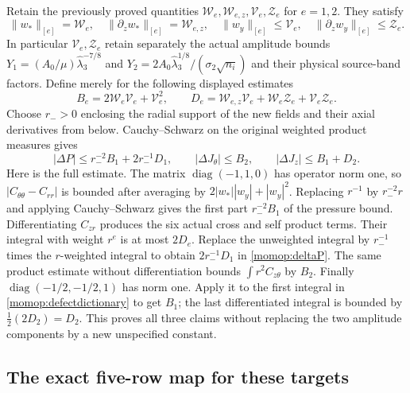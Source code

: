 \documentclass[11pt]{article}
\begin{document}
Retain the previously proved quantities
$\mathcal W_e,\mathcal W_{e,z},\mathcal V_e,\mathcal Z_e$ for
$e=1,2$. They satisfy
\[
 \|w_*\|_{[e]}=\mathcal W_e,\quad
 \|\partial_zw_*\|_{[e]}=\mathcal W_{e,z},\quad
 \|w_y\|_{[e]}\le\mathcal V_e,\quad
 \|\partial_zw_y\|_{[e]}\le\mathcal Z_e.
\]
In particular $\mathcal V_e,\mathcal Z_e$ retain separately the
actual amplitude bounds
$Y_1=(A_0/\mu)\widehat\lambda_3^{-7/8}$ and
$Y_2=2A_0\widehat\lambda_3^{1/8}/(\sigma_2\sqrt{n_i})$
and their physical source-band factors. Define merely for the
following displayed estimates
\[
 B_e=2\mathcal W_e\mathcal V_e+\mathcal V_e^2,\qquad
 D_e=\mathcal W_{e,z}\mathcal V_e+
                    \mathcal W_e\mathcal Z_e+\mathcal V_e\mathcal Z_e.
\]
Choose $r_->0$ enclosing the radial support of the new fields and
their axial derivatives from below. Cauchy--Schwarz on the original
weighted product measures gives
\begin{equation}\label{momop:targetbounds}
 |\Delta P|\le r_-^{-2}B_1+2r_-^{-1}D_1,\qquad
 |\Delta J_\theta|\le B_2,\qquad
 |\Delta J_z|\le B_1+D_2.
\end{equation}
Here is the full estimate. The matrix
$\operatorname{diag}(-1,1,0)$ has operator norm one, so
$|C_{\theta\theta}-C_{rr}|$ is bounded after averaging by
$2|w_*||w_y|+|w_y|^2$. Replacing $r^{-1}$ by
$r_-^{-2}r$ and applying Cauchy--Schwarz gives the first part
$r_-^{-2}B_1$ of the pressure bound. Differentiating $C_{zr}$
produces the six actual cross and self product terms. Their integral
with weight $r^e$ is at most $2D_e$. Replace the unweighted
integral by $r_-^{-1}$ times the $r$-weighted integral to obtain
$2r_-^{-1}D_1$ in \eqref{momop:deltaP}.
The same product estimate without differentiation bounds
$\int r^2C_{z\theta}$ by $B_2$.
Finally $\operatorname{diag}(-1/2,-1/2,1)$ has norm one.
Apply it to the first integral in \eqref{momop:defectdictionary}
to get $B_1$; the last differentiated integral is bounded by
$\tfrac12(2D_2)=D_2$. This proves all three claims without
replacing the two amplitude components by a new unspecified constant.

\subsection{The exact five-row map for these targets}
\end{document}
